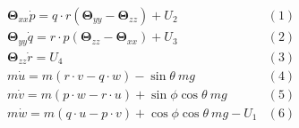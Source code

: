 \documentclass[landscape,a0paper,fontscale=0.285]{baposter} %
\begin{document}
\begin{poster}
{\colorbox[HTML]{CCFFFF}{}
\[
\begin{array}{lr}
    \boldsymbol{\Theta}_{xx}\dot{p} = q \cdot r(\boldsymbol{\Theta}_{yy} - \boldsymbol{\Theta}_{zz}) + U_2 & (1) \\
    \boldsymbol{\Theta}_{yy}\dot{q} = r \cdot p(\boldsymbol{\Theta}_{zz} - \boldsymbol{\Theta}_{xx}) + U_3 & (2) \\
    \boldsymbol{\Theta}_{zz}\dot{r} = U_4 & (3) \\
    m\dot{u} = m(r \cdot v - q \cdot w) - \sin\theta~ mg & (4) \\
    m\dot{v} = m(p \cdot w - r \cdot u) + \sin\phi \cos\theta ~ mg & (5) \\
    m\dot{w} = m(q \cdot u - p \cdot v) + \cos\phi \cos\theta ~ mg - U_1 & (6)
\end{array}
\]




}







\end{poster}
\end{document}
